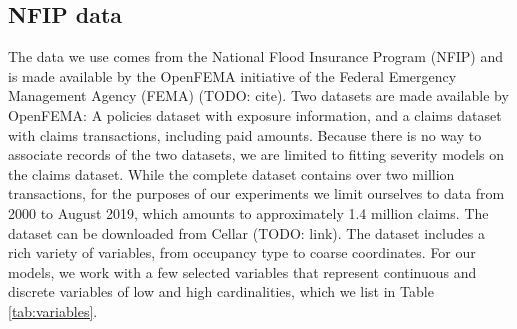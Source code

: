 \documentclass{article}
\begin{document}
\hypertarget{nfip-data}{%
\subsection{NFIP data}\label{nfip-data}}

The data we use comes from the National Flood Insurance Program (NFIP)
and is made available by the OpenFEMA initiative of the Federal
Emergency Management Agency (FEMA) (TODO: cite). Two datasets are made
available by OpenFEMA: A policies dataset with exposure information, and
a claims dataset with claims transactions, including paid amounts.
Because there is no way to associate records of the two datasets, we are
limited to fitting severity models on the claims dataset. While the
complete dataset contains over two million transactions, for the
purposes of our experiments we limit ourselves to data from 2000 to
August 2019, which amounts to approximately 1.4 million claims. The
dataset can be downloaded from Cellar (TODO: link). The dataset includes
a rich variety of variables, from occupancy type to coarse coordinates.
For our models, we work with a few selected variables that represent
continuous and discrete variables of low and high cardinalities, which
we list in Table \ref{tab:variables}.
\end{document}
